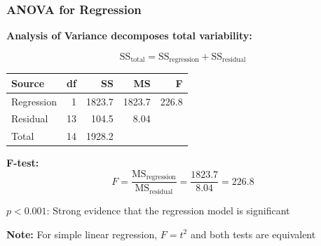 \documentclass{beamer}
\begin{document}
\begin{frame}
\frametitle{ANOVA for Regression}
\textbf{Analysis of Variance decomposes total variability:}

$$\text{SS}_{\text{total}} = \text{SS}_{\text{regression}} + \text{SS}_{\text{residual}}$$

\vspace{0.3cm}
\begin{center}
\begin{tabular}{lrrrr}
\toprule
Source & df & SS & MS & F \\
\midrule
Regression & 1 & 1823.7 & 1823.7 & 226.8 \\
Residual & 13 & 104.5 & 8.04 & \\
\midrule
Total & 14 & 1928.2 & & \\
\bottomrule
\end{tabular}
\end{center}

\vspace{0.3cm}
\textbf{F-test:}
$$F = \frac{\text{MS}_{\text{regression}}}{\text{MS}_{\text{residual}}} = \frac{1823.7}{8.04} = 226.8$$

$p < 0.001$: Strong evidence that the regression model is significant

\vspace{0.3cm}
\textbf{Note:} For simple linear regression, $F = t^2$ and both tests are equivalent
\end{frame}
\end{document}
